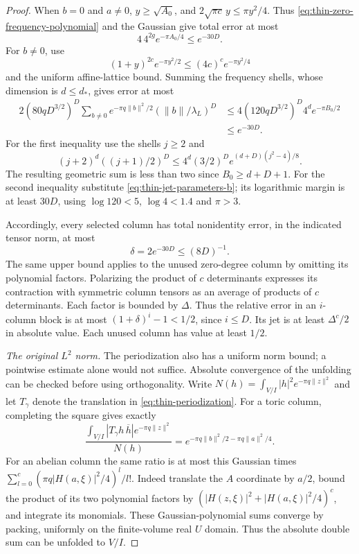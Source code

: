 \begin{proof}
When $b=0$ and $a\ne0$, $y\ge\sqrt{A_0}$, and
$2\sqrt{\pi c}\,y\le\pi y^2/4$.
Thus \eqref{eq:thin-zero-frequency-polynomial} and the Gaussian
give total error at most
\[
                 4\,4^{2g}e^{-\pi A_0/4}\le e^{-30D}.
\]
For $b\ne0$, use
\[
 (1+y)^{2c}e^{-\pi y^2/2}
                    \le(4c)^c e^{-\pi y^2/4}
\]
and the uniform affine-lattice bound.  Summing the frequency
shells, whose dimension is $d\le d_*$, gives error at most
\begin{align*}
 2(80qD^{3/2})^D
   \sum_{b\ne0}e^{-\pi q\|b\|^2/2}
                            (\|b\|/\lambda_L)^D
 &\le4(120qD^{3/2})^D4^d e^{-\pi B_0/2}\\
 &\le e^{-30D}.
\end{align*}
For the first inequality use the shells $j\ge2$ and
\[
 (j+2)^d((j+1)/2)^D
 \le4^d(3/2)^D e^{(d+D)(j^2-4)/8}.
\]
The resulting geometric sum is less than two since
$B_0\ge d+D+1$.  For the second inequality substitute
\eqref{eq:thin-jet-parameters-b}; its logarithmic margin is at
least $30D$, using $\log120<5$, $\log4<1.4$ and $\pi>3$.

Accordingly, every selected column has total nonidentity error,
in the indicated tensor norm, at most
\begin{equation}\label{eq:thin-column-error}
                            \delta=2e^{-30D}\le(8D)^{-1}.
\end{equation}
The same upper bound applies to the unused zero-degree column
by omitting its polynomial factors.  Polarizing the product of
$c$ determinants expresses its contraction with symmetric
column tensors as an average of products of $c$ determinants.
Each factor is bounded by $\Delta$.  Thus the relative error in
an $i$-column block is at most $(1+\delta)^i-1<1/2$, since
$i\le D$.  Its jet is at least $\Delta^c/2$ in absolute value.
Each unused column has value at least $1/2$.

\emph{The original $L^2$ norm.}
The periodization also has a uniform norm bound; a pointwise
estimate alone would not suffice.  Absolute convergence of the
unfolding can be checked before using orthogonality.  Write
$N(h)=\int_{V/I}|h|^2e^{-\pi q\|z\|^2}$ and let $T_\gamma$
denote the translation in \eqref{eq:thin-periodization}.
For a toric column, completing the square gives exactly
\[
 \frac{\int_{V/I}|T_\gamma h\,\overline h|
                            e^{-\pi q\|z\|^2}}{N(h)}
       =e^{-\pi q\|b\|^2/2-\pi q\|a\|^2/4}.
\]
For an abelian column the same ratio is at most this Gaussian
times $\sum_{l=0}^c(\pi q|H(a,\xi)|^2/4)^l/l!$.
Indeed translate the $A$ coordinate by $a/2$, bound the product
of its two polynomial factors by
$(|H(z,\xi)|^2+|H(a,\xi)|^2/4)^c$, and integrate its monomials.
These Gaussian-polynomial sums converge by packing, uniformly
on the finite-volume real $U$ domain.  Thus the absolute double
sum can be unfolded to $V/I$.


\end{proof}

